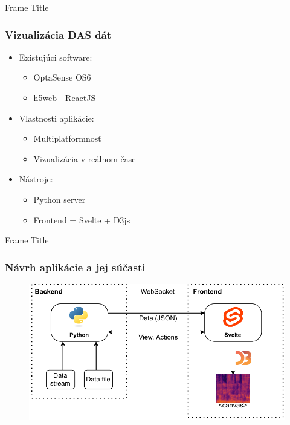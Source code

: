 \documentclass[%
  12pt,       				%
	t,                  %
	aspectratio=1610,   %
	unicode,						%
]{beamer}				    	%
\begin{document}
\begin{frame}{Frame Title}
    \frametitle{Vizualizácia DAS dát}
    \begin{itemize}
        \item Existujúci software:
        \begin{itemize}
            \item OptaSense OS6
            \item h5web - ReactJS
        \end{itemize}
        \item Vlastnosti aplikácie:
        \begin{itemize}
            \item Multiplatformnosť
            \item Vizualizácia v reálnom čase
        \end{itemize}
        
        \item Nástroje:
        \begin{itemize}
            \item Python server
            \item Frontend = Svelte + D3js 
        \end{itemize}
    \end{itemize}
\end{frame}

\begin{frame}{Frame Title}
    \frametitle{Návrh aplikácie a jej súčasti}
    \begin{figure}
        \centering
        \includegraphics{obrazky/appstack.drawio.pdf}
        \label{fig:app_overview}
    \end{figure}
\end{frame}
\end{document}

